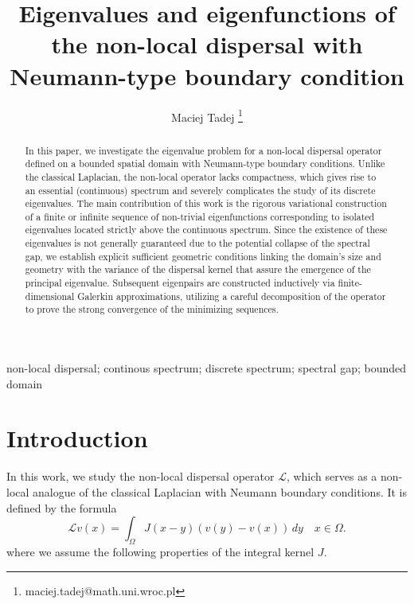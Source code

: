 \documentclass[11pt, a4paper]{article}
\title{Eigenvalues and eigenfunctions of the non-local dispersal with Neumann-type boundary condition}
\author[1]{Maciej Tadej \thanks{maciej.tadej@math.uni.wroc.pl}}
\affil[1]{\textit{Mathematical Institute, University of Wrocław, pl. Grunwaldzki 2, 50-384 Wrocław, Poland}}
\date{}
\theoremstyle{break}
\theoremstyle{break}
\theoremstyle{break}
\theoremstyle{break}
\theoremstyle{break}
\theoremstyle{break}
\theoremstyle{break}
\theoremstyle{break}
\theoremstyle{break}
\begin{document}
\maketitle

\hspace{20pt}

\begin{abstract}
    In this paper, we investigate the eigenvalue problem for a non-local dispersal operator defined on a bounded spatial domain with Neumann-type boundary conditions. Unlike the classical Laplacian, the non-local operator lacks compactness, which gives rise to an essential (continuous) spectrum and severely complicates the study of its discrete eigenvalues. The main contribution of this work is the rigorous variational construction of a finite or infinite sequence of non-trivial eigenfunctions corresponding to isolated eigenvalues located strictly above the continuous spectrum. Since the existence of these eigenvalues is not generally guaranteed due to the potential collapse of the spectral gap, we establish explicit sufficient geometric conditions linking the domain's size and geometry with the variance of the dispersal kernel that assure the emergence of the principal eigenvalue. Subsequent eigenpairs are constructed inductively via finite-dimensional Galerkin approximations, utilizing a careful decomposition of the operator to prove the strong convergence of the minimizing sequences.
\end{abstract}

\begin{keywords}
    \: non-local dispersal; continous spectrum; discrete spectrum; spectral gap; bounded domain
\end{keywords}

\newpage

\section{Introduction}

In this work, we study the non-local dispersal operator $\mathcal{L}$, which serves as a non-local analogue of the classical Laplacian with Neumann boundary conditions. It is defined by the formula
\begin{equation}
    \label{EQ:NonLocalNeumann}
    \mathcal{L}v(x) = \int_{\Omega} J(x-y) (v(y) - v(x)) \, dy \quad x \in \Omega.
\end{equation}
where we assume the following properties of the integral kernel $J$.
\end{document}
